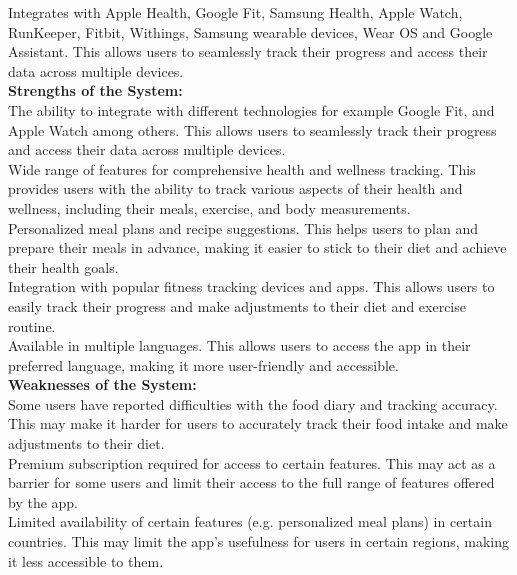 \documentclass {article}
\begin{document}
\noindent Integrates with Apple Health, Google Fit, Samsung Health, Apple Watch, RunKeeper, Fitbit, Withings, Samsung wearable devices, Wear OS and Google Assistant. This allows users to seamlessly track their progress and access their data across multiple devices.\\

\noindent \textbf{Strengths of the System:\\}
\noindent The ability to integrate with different technologies for example Google Fit, and Apple Watch among others. This allows users to seamlessly track their progress and access their data across multiple devices.\\

\noindent Wide range of features for comprehensive health and wellness tracking. This provides users with the ability to track various aspects of their health and wellness, including their meals, exercise, and body measurements.\\

\noindent Personalized meal plans and recipe suggestions. This helps users to plan and prepare their meals in advance, making it easier to stick to their diet and achieve their health goals.\\

\noindent Integration with popular fitness tracking devices and apps. This allows users to easily track their progress and make adjustments to their diet and exercise routine.\\

\noindent Available in multiple languages. This allows users to access the app in their preferred language, making it more user-friendly and accessible.\\

\noindent \textbf{Weaknesses of the System:\\}
\noindent Some users have reported difficulties with the food diary and tracking accuracy. This may make it harder for users to accurately track their food intake and make adjustments to their diet.\\

\noindent Premium subscription required for access to certain features. This may act as a barrier for some users and limit their access to the full range of features offered by the app.\\

\noindent Limited availability of certain features (e.g. personalized meal plans) in certain countries. This may limit the app's usefulness for users in certain regions, making it less accessible to them.\\
\end{document}
